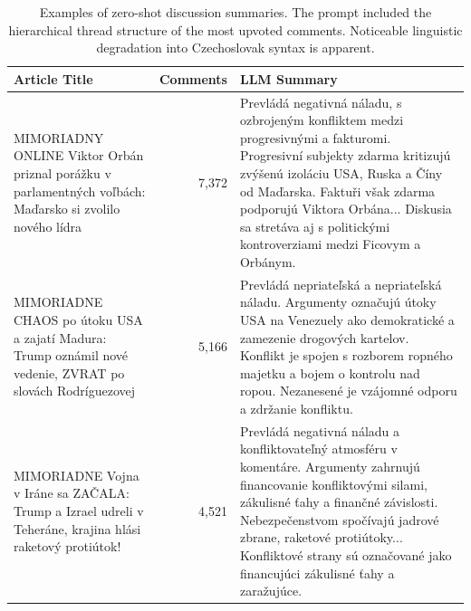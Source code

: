 \documentclass[11pt,a4paper]{article}
\begin{document}
\vspace{1em}

\begin{table}[H]
	\centering
	\scriptsize
	\begin{tabular}{@{} >{\raggedright\arraybackslash}p{5cm} r >{\raggedright\arraybackslash}p{8cm} @{}}
		\toprule
		\textbf{Article Title}                                                                                    & \textbf{Comments} & \textbf{LLM Summary}                                                                                                                                                                                                                                                                                            \\ \midrule
		MIMORIADNY ONLINE Viktor Orbán priznal porážku v parlamentných voľbách: Maďarsko si zvolilo nového lídra  & 7,372             & Prevládá negativná náladu, s ozbrojeným konfliktem medzi progresivnými a fakturomi. Progresivní subjekty zdarma kritizujú zvýšenú izoláciu USA, Ruska a Číny od Maďarska. Faktuři však zdarma podporujú Viktora Orbána... Diskusia sa stretáva aj s politickými kontroverziami medzi Ficovym a Orbánym.         \\ \midrule
		MIMORIADNE CHAOS po útoku USA a zajatí Madura: Trump oznámil nové vedenie, ZVRAT po slovách Rodríguezovej & 5,166             & Prevládá nepriateľská a nepriateľská náladu. Argumenty označujú útoky USA na Venezuely ako demokratické a zamezenie drogových kartelov. Konflikt je spojen s rozborem ropného majetku a bojem o kontrolu nad ropou. Nezanesené je vzájomné odporu a zdržanie konfliktu.                                         \\ \midrule
		MIMORIADNE Vojna v Iráne sa ZAČALA: Trump a Izrael udreli v Teheráne, krajina hlási raketový protiútok!   & 4,521             & Prevládá negativná náladu a konfliktovateľný atmosféru v komentáre. Argumenty zahrnujú financovanie konfliktovými silami, zákulisné ťahy a finančné závislosti. Nebezpečenstvom spočívajú jadrové zbrane, raketové protiútoky... Konfliktové strany sú označované jako financujúci zákulisné ťahy a zaražujúce. \\ \bottomrule
	\end{tabular}
	\caption{Examples of zero-shot discussion summaries. The prompt included the hierarchical thread structure of the most upvoted comments. Noticeable linguistic degradation into Czechoslovak syntax is apparent.}
	\label{tab:generated_discussion_summaries}
\end{table}
\end{document}
